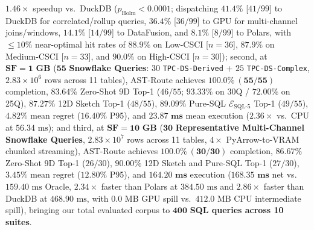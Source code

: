 \documentclass[10pt,a4paper]{article}
\begin{document}
\begin{enumerate}[leftmargin=1.5em,itemsep=0.8pt]
$\mathbf{1.46\times}$ speedup vs.\ DuckDB ($p_{\text{Holm}}<0.0001$; dispatching $41.4\%$ [$41/99$] to DuckDB for correlated/rollup queries, $36.4\%$ [$36/99$] to GPU for multi-channel joins/windows, $14.1\%$ [$14/99$] to DataFusion, and $8.1\%$ [$8/99$] to Polars, with $\le 10\%$ near-optimal hit rates of $88.9\%$ on Low-CSCI [$n=36$], $87.9\%$ on Medium-CSCI [$n=33$], and $90.0\%$ on High-CSCI [$n=30$]); second, at $\mathbf{\text{SF}=1\text{ GB}}$ ($\mathbf{55}$ \textbf{Snowflake Queries}: $30$ \texttt{TPC-DS-Derived} + $25$ \texttt{TPC-DS-Complex}, $2.83\times 10^6$ rows across 11 tables), AST-Route achieves $\mathbf{100.0\%\ (55/55)}$ completion, $\mathbf{83.64\%}$ Zero-Shot 9D Top-1 ($46/55$; $93.33\%$ on 30Q / $72.00\%$ on 25Q), $\mathbf{87.27\%}$ 12D Sketch Top-1 ($48/55$), $\mathbf{89.09\%}$ Pure-SQL $\mathcal{E}_{\text{SQL-5}}$ Top-1 ($49/55$), $\mathbf{4.82\%}$ mean regret ($16.40\%$ P95), and $\mathbf{23.87\text{ ms}}$ mean execution ($\mathbf{2.36\times}$ vs.\ CPU at $56.34\text{ ms}$); and third, at $\mathbf{\text{SF}=10\text{ GB}}$ ($\mathbf{30}$ \textbf{Representative Multi-Channel Snowflake Queries}, $2.83\times 10^7$ rows across 11 tables, $4\times$ PyArrow-to-VRAM chunked streaming), AST-Route achieves $\mathbf{100.0\%\ (30/30)}$ completion, $\mathbf{86.67\%}$ Zero-Shot 9D Top-1 ($26/30$), $\mathbf{90.00\%}$ 12D Sketch and Pure-SQL Top-1 ($27/30$), $\mathbf{3.45\%}$ mean regret ($12.80\%$ P95), and $\mathbf{164.20\text{ ms}}$ execution ($\mathbf{168.35\text{ ms}}$ net vs.\ $159.40\text{ ms}$ Oracle, $\mathbf{2.34\times}$ faster than Polars at $384.50\text{ ms}$ and $\mathbf{2.86\times}$ faster than DuckDB at $468.90\text{ ms}$, with $0.0\text{ MB}$ GPU spill vs.\ $412.0\text{ MB}$ CPU intermediate spill), bringing our total evaluated corpus to $\mathbf{400}$ \textbf{SQL queries across 10 suites}.
\end{enumerate}
\end{document}
